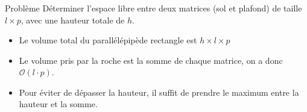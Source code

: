 \begin{frame}
    \frametitle{\problemtitle}
    \begin{block}{Problème}
        Déterminer l'espace libre entre deux matrices (sol et plafond) de taille $l \times p$, avec une hauteur totale de $h$.
    \end{block}
    \begin{itemize}
        \item<+-> Le volume total du parallélépipède rectangle est $h\times l\times p$
        \item<+-> Le volume pris par la roche est la somme de chaque matrice, on a donc $\mathcal{O}(l\cdot p)$.
        \item<+-> Pour éviter de dépasser la hauteur, il suffit de prendre le maximum entre la hauteur et la somme.
    \end{itemize}
    \solvestats
\end{frame}
